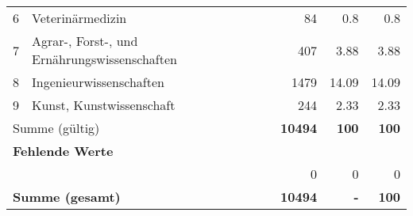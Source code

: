 \begin{longtable}{lXrrr}
     6 &
     \multicolumn{1}{X}{ Veterinärmedizin   } &


       \num{84} &
       \num[round-mode=places,round-precision=2]{0.8} &
         \num[round-mode=places,round-precision=2]{0.8} \\

     7 &
     \multicolumn{1}{X}{ Agrar-, Forst-, und Ernährungswissenschaften   } &


       \num{407} &
       \num[round-mode=places,round-precision=2]{3.88} &
         \num[round-mode=places,round-precision=2]{3.88} \\

     8 &
     \multicolumn{1}{X}{ Ingenieurwissenschaften   } &


       \num{1479} &
       \num[round-mode=places,round-precision=2]{14.09} &
         \num[round-mode=places,round-precision=2]{14.09} \\

     9 &
     \multicolumn{1}{X}{ Kunst, Kunstwissenschaft   } &


       \num{244} &
       \num[round-mode=places,round-precision=2]{2.33} &
         \num[round-mode=places,round-precision=2]{2.33} \\
     \midrule
     \multicolumn{2}{l}{Summe (gültig)} &
       \textbf{\num{10494}} &
     \textbf{\num{100}} &
       \textbf{\num[round-mode=places,round-precision=2]{100}} \\
     \multicolumn{5}{l}{\textbf{Fehlende Werte}}\\
      & & 0 & 0 & 0 \\
     \midrule
     \multicolumn{2}{l}{\textbf{Summe (gesamt)}} &
          \textbf{\num{10494}} &
        \textbf{-} &
        \textbf{\num{100}} \\
     \bottomrule
     \end{longtable}
     
